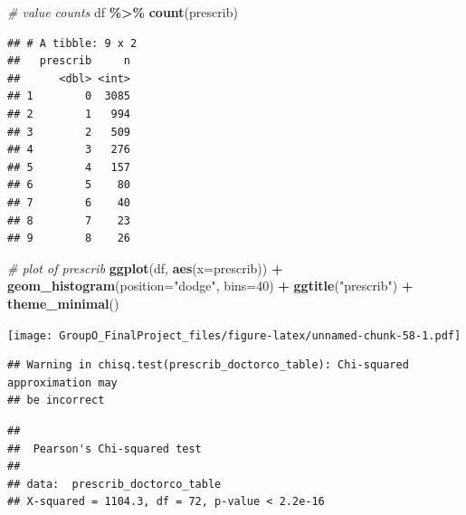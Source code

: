 \documentclass[
]{article}
\newenvironment{Shaded}{\begin{snugshade}}{\end{snugshade}}
\newcommand{\AttributeTok}[1]{\textcolor[rgb]{0.13,0.29,0.53}{#1}}
\newcommand{\CommentTok}[1]{\textcolor[rgb]{0.56,0.35,0.01}{\textit{#1}}}
\newcommand{\DecValTok}[1]{\textcolor[rgb]{0.00,0.00,0.81}{#1}}
\newcommand{\FunctionTok}[1]{\textcolor[rgb]{0.13,0.29,0.53}{\textbf{#1}}}
\newcommand{\NormalTok}[1]{#1}
\newcommand{\OtherTok}[1]{\textcolor[rgb]{0.56,0.35,0.01}{#1}}
\newcommand{\SpecialCharTok}[1]{\textcolor[rgb]{0.81,0.36,0.00}{\textbf{#1}}}
\newcommand{\StringTok}[1]{\textcolor[rgb]{0.31,0.60,0.02}{#1}}
\begin{document}
\begin{Shaded}
\begin{Highlighting}[]
\CommentTok{\# value counts}
\NormalTok{df }\SpecialCharTok{\%\textgreater{}\%} \FunctionTok{count}\NormalTok{(prescrib)}
\end{Highlighting}
\end{Shaded}

\begin{verbatim}
## # A tibble: 9 x 2
##   prescrib     n
##      <dbl> <int>
## 1        0  3085
## 2        1   994
## 3        2   509
## 4        3   276
## 5        4   157
## 6        5    80
## 7        6    40
## 8        7    23
## 9        8    26
\end{verbatim}

\begin{Shaded}
\begin{Highlighting}[]
\CommentTok{\# plot of prescrib}
\FunctionTok{ggplot}\NormalTok{(df, }\FunctionTok{aes}\NormalTok{(}\AttributeTok{x=}\NormalTok{prescrib)) }\SpecialCharTok{+}
  \FunctionTok{geom\_histogram}\NormalTok{(}\AttributeTok{position=}\StringTok{"dodge"}\NormalTok{, }\AttributeTok{bins=}\DecValTok{40}\NormalTok{) }\SpecialCharTok{+}
  \FunctionTok{ggtitle}\NormalTok{(}\StringTok{"prescrib"}\NormalTok{) }\SpecialCharTok{+}
  \FunctionTok{theme\_minimal}\NormalTok{()}
\end{Highlighting}
\end{Shaded}

\texttt{[image: GroupO\_FinalProject\_files/figure-latex/unnamed-chunk-58-1.pdf]}

\begin{Shaded}
\end{Shaded}

\begin{verbatim}
## Warning in chisq.test(prescrib_doctorco_table): Chi-squared approximation may
## be incorrect
\end{verbatim}

\begin{verbatim}
## 
##  Pearson's Chi-squared test
## 
## data:  prescrib_doctorco_table
## X-squared = 1104.3, df = 72, p-value < 2.2e-16
\end{verbatim}
\end{document}
